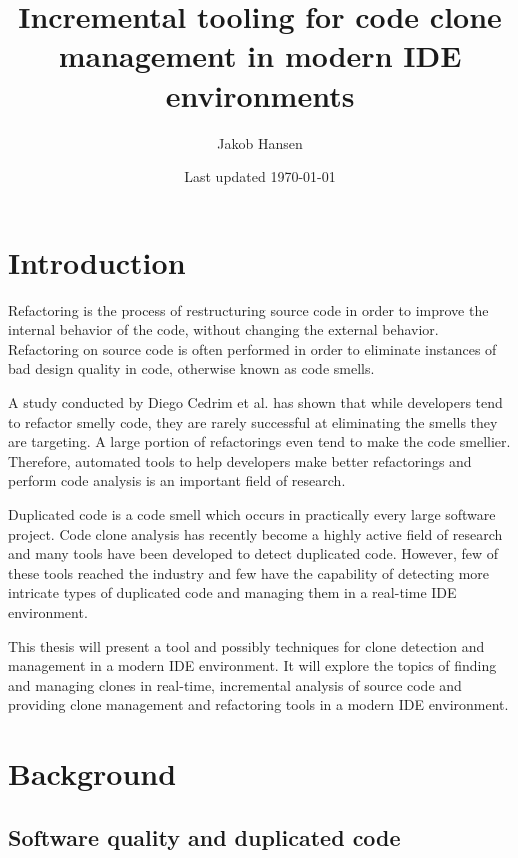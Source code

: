 \documentclass[12pt]{article}
\title{\vspace{-20px}Incremental tooling for code clone management in modern IDE environments}
\author{Jakob Hansen}
\date{Last updated \today}
\begin{document}
\maketitle


\tableofcontents

\newpage

\section{Introduction}

Refactoring is the process of restructuring source code in order to improve the internal behavior
of the code, without changing the external behavior\cite[9]{fowlerrefactoring}.
Refactoring on source code is often performed in order to eliminate instances of bad
design quality in code, otherwise known as code smells.

A study conducted by Diego Cedrim et al. has shown that while developers tend to refactor
smelly code, they are rarely successful at eliminating the smells they are
targeting\cite{Rohit_Gheyi_Impact}. A large portion of refactorings even tend to make the
code smellier. Therefore, automated tools to help developers make better refactorings and
perform code analysis is an important field of research.

Duplicated code is a code smell which occurs in practically every large software project.
Code clone analysis has recently become a highly active field of research and many tools
have been developed to detect duplicated code\cite[7]{Inoue_introduction_to_cc}. However,
few of these tools reached the industry and few have the capability of detecting more
intricate types of duplicated code and managing them in a real-time IDE environment.

This thesis will present a tool and possibly techniques for clone detection and management
in a modern IDE environment. It will explore the topics of finding and managing clones in
real-time, incremental analysis of source code and providing clone management and
refactoring tools in a modern IDE environment.

\section{Background}

\subsection{Software quality and duplicated code}
\end{document}
